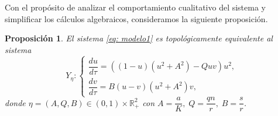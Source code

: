 \documentclass[]{article}
\newtheorem{proposition}{Proposición}[section]
\theoremstyle{remark}
\begin{document}
	Con el propósito de analizar el comportamiento cualitativo del sistema y simplificar los cálculos algebraicos, consideramos la siguiente proposición.
	\begin{proposition}
		El sistema \eqref{eq: modelo1} es topológicamente equivalente al sistema
		\begin{equation}
			Y_{\eta}:
			\begin{cases}
				\dfrac{du}{d \tau} = \left((1 - u)(u^{2} + A^{2}) - Q u v\right)u^{2}, \\[5pt]
				\dfrac{dv}{d \tau} = B(u - v)(u^{2} + A^{2})v,
			\end{cases}
			\label{eq: modelo2}
		\end{equation}
		donde $\eta = (A, Q, B) \in (0, 1) \times \mathbb{R}^{2}_{+}$ con $A = \dfrac{a}{K}, \; Q = \dfrac{qn}{r}, \; B = \dfrac{s}{r}$.
	\end{proposition}
\end{document}
